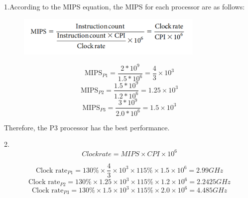 \documentclass[cn,12pt]{homework}
\begin{document}
\begin{solution}
  \quad
  1.According to the MIPS equation, the MIPS for each processor  are as follows:

  \begin{figure}[h!]
    \centering
    \includegraphics[width=0.8\textwidth]{./figures/mips.png}
    \label{fig:pro1}
  \end{figure}

    \begin{equation}
      \text{MIPS}_{P1} = \frac{2*10^9}{1.5*10^6} = \frac{4}{3} \times 10^3
  \end{equation}
    \begin{equation}
      \text{MIPS}_{P2} = \frac{1.5*10^9}{1.2*10^6} = 1.25 \times 10^3
  \end{equation}
    \begin{equation}
      \text{MIPS}_{P3} = \frac{3*10^9}{2.0*10^6} = 1.5 \times 10^3
  \end{equation}

  Therefore, the P3 processor has the best performance.

  2.\begin{equation}
      Clock rate = MIPS \times CPI \times 10^6
  \end{equation}

  \begin{equation}
    \text{Clock rate}_{P1} = 130\% \times \frac{4}{3} \times 10^3 \times 115\% \times 1.5 \times 10^6 = 2.99 GHz
  \end{equation}
  \begin{equation}
    \text{Clock rate}_{P2} = 130\% \times 1.25 \times 10^3 \times 115\% \times 1.2 \times 10^6 = 2.2425 GHz
  \end{equation}
  \begin{equation}
    \text{Clock rate}_{P3} = 130\% \times 1.5 \times 10^3 \times 115\% \times 2.0 \times 10^6 = 4.485 GHz
  \end{equation}
\end{solution}
\end{document}

